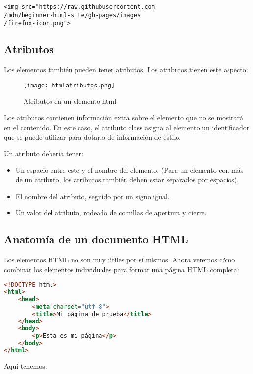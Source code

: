 \begin{lstlisting}
<img src="https://raw.githubusercontent.com
/mdn/beginner-html-site/gh-pages/images
/firefox-icon.png">
\end{lstlisting}

\subsection{Atributos}

Los elementos también pueden tener atributos. Los atributos tienen este aspecto:

\begin{figure}[H]
	\center
	\texttt{[image: htmlatributos.png]}
	\caption{Atributos en un elemento html}
\end{figure}

Los atributos contienen información extra sobre el elemento que no se mostrará en el contenido. En este caso, el atributo class asigna al elemento un identificador que se puede utilizar para dotarlo de información de estilo.

Un atributo debería tener:

\begin{itemize}
	\item Un espacio entre este y el nombre del elemento. (Para un elemento con más de un atributo, los atributos también deben estar separados por espacios).
	\item El nombre del atributo, seguido por un signo igual.
	\item Un valor del atributo, rodeado de comillas de apertura y cierre.
\end{itemize}

\subsection{Anatomía de un documento HTML}

Los elementos HTML no son muy útiles por sí mismos. Ahora veremos cómo combinar los elementos individuales para formar una página HTML completa:

\begin{lstlisting}[language=html]
<!DOCTYPE html>
<html>
	<head>
		<meta charset="utf-8">
		<title>Mi página de prueba</title>
	</head>
	<body>
		<p>Esta es mi página</p>
	</body>
</html>
\end{lstlisting}

Aquí tenemos:

